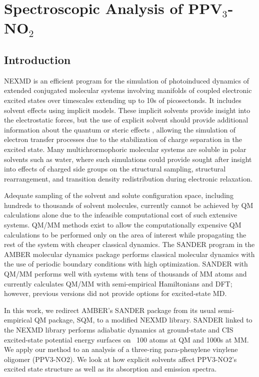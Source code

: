 \chapter{Spectroscopic Analysis of PPV\(_3\)-NO\(_2\)}

\section{Introduction}
   NEXMD is an efficient program for the simulation of photoinduced dynamics of extended conjugated molecular systems involving manifolds of coupled electronic excited states over timescales extending up to 10s of picosectonds. \cite{sifain2018photoexcited, Bjorgaard2015, case2020a, tretiak02_densit_matrix_analy_simul_elect, malone2020nexmd}
   It includes solvent effects using implicit models. These implicit solvents provide insight into the electrostatic forces, but the use of explicit solvent should provide additional information about the quantum or steric effects , allowing the simulation of electron transfer processes due to the stabilization of charge separation in the excited state.
   Many multichrormophoric molecular systems are soluble in polar solvents such as water, where such simulations could provide sought after insight into effects of charged side groups on the structural sampling, structural rearrangement, and transition density redistribution during electronic relaxation.  

   Adequate sampling of the solvent and solute configuration space, including hundreds to thousands of solvent molecules, currently cannot be achieved by QM calculations alone due to the infeasible computational cost of such extensive systems. \cite{barbatti2011nonadiabatic}
   QM/MM methods exist to allow the computationally expensive QM calculations to be performed only on the area of interest while propagating the rest of the system with cheaper classical dynamics.
   The SANDER program in the AMBER molecular dynamics package performs classical molecular dynamics with the use of periodic boundary conditions with high optimization.
   SANDER with QM/MM performs well with systems with tens of thousands of MM atoms and currently calculates QM/MM with semi-empirical Hamiltonians and DFT; however, previous versions did not provide options for excited-state MD.  

   In this work, we redirect AMBER's SANDER package from its usual semi-empirical QM package, SQM, to a modified NEXMD library.
   SANDER linked to the NEXMD library performs adiabatic dynamics at ground-state and CIS excited-state potential energy surfaces on ~100 atoms at QM and 1000s at MM.
   We apply our method to an analysis of a three-ring para-phenylene vinylene oligomer (PPV3-NO2).
   We look at how explicit solvents affect PPV3-NO2's excited state structure as well as its absorption and emission spectra.

